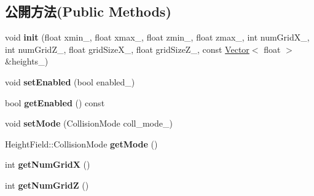 \subsection*{公開方法(Public Methods)}
\begin{DoxyCompactItemize}
\item 
void {\bfseries init} (float xmin\+\_\+, float xmax\+\_\+, float zmin\+\_\+, float zmax\+\_\+, int num\+Grid\+X\+\_\+, int num\+Grid\+Z\+\_\+, float grid\+Size\+X\+\_\+, float grid\+Size\+Z\+\_\+, const \hyperlink{class_magnum_1_1_vector}{Vector}$<$ float $>$ \&heights\+\_\+)\hypertarget{class_magnum_1_1_scene_collision_1_1_height_field_ab74ec98982526edfdca5d0e5db8c496b}{}\label{class_magnum_1_1_scene_collision_1_1_height_field_ab74ec98982526edfdca5d0e5db8c496b}

\item 
void {\bfseries set\+Enabled} (bool enabled\+\_\+)\hypertarget{class_magnum_1_1_scene_collision_1_1_height_field_addcd9b6e5251976736e388955dc593d0}{}\label{class_magnum_1_1_scene_collision_1_1_height_field_addcd9b6e5251976736e388955dc593d0}

\item 
bool {\bfseries get\+Enabled} () const \hypertarget{class_magnum_1_1_scene_collision_1_1_height_field_aa2e8ff3a99dc02a33cda2812be07ca57}{}\label{class_magnum_1_1_scene_collision_1_1_height_field_aa2e8ff3a99dc02a33cda2812be07ca57}

\item 
void {\bfseries set\+Mode} (Collision\+Mode coll\+\_\+mode\+\_\+)\hypertarget{class_magnum_1_1_scene_collision_1_1_height_field_ae96e1b9a117ddd21306e248d707d094b}{}\label{class_magnum_1_1_scene_collision_1_1_height_field_ae96e1b9a117ddd21306e248d707d094b}

\item 
Height\+Field\+::\+Collision\+Mode {\bfseries get\+Mode} ()\hypertarget{class_magnum_1_1_scene_collision_1_1_height_field_ad898907dc99013e0856c7fa9158a6504}{}\label{class_magnum_1_1_scene_collision_1_1_height_field_ad898907dc99013e0856c7fa9158a6504}

\item 
int {\bfseries get\+Num\+GridX} ()\hypertarget{class_magnum_1_1_scene_collision_1_1_height_field_a8be13ec763ab6bf1e2dd274ee94ee5c6}{}\label{class_magnum_1_1_scene_collision_1_1_height_field_a8be13ec763ab6bf1e2dd274ee94ee5c6}

\item 
int {\bfseries get\+Num\+GridZ} ()\hypertarget{class_magnum_1_1_scene_collision_1_1_height_field_ac19b07a7d43d24ea4c4c553b388d8c4e}{}\label{class_magnum_1_1_scene_collision_1_1_height_field_ac19b07a7d43d24ea4c4c553b388d8c4e}


\end{DoxyCompactItemize}
